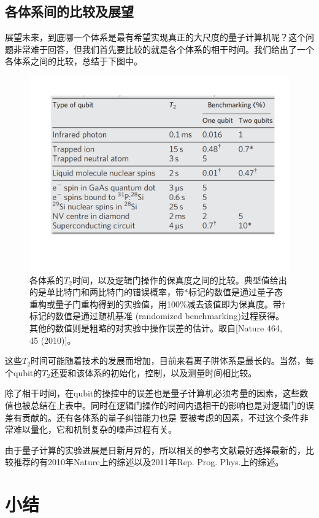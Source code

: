 \subsection{各体系间的比较及展望}
展望未来，到底哪一个体系是最有希望实现真正的大尺度的量子计算机呢？这个问题非常难于回答，但我们首先要比较的就是各个体系的相干时间。我们给出了一个各体系之间的比较，总结于下图中。
\begin{figure}[htbp]
            \begin{center}
              \includegraphics[width= 0.8\columnwidth]{figures/compare.pdf}
              \caption{各体系的$T_2$时间，以及逻辑门操作的保真度之间的比较。典型值给出的是单比特门和两比特门的错误概率，带$\ast$标记的数值是通过量子态重构或量子门重构得到的实验值，用100$\%$减去该值即为保真度。带$\dagger$标记的数值是通过随机基准
              (randomized benchmarking)过程获得。其他的数值则是粗略的对实验中操作误差的估计。取自[Nature 464, 45 (2010)\cite{review1}]。
              }
              \label{nmr}
            \end{center}
  \end{figure}
这些$T_2$时间可能随着技术的发展而增加，目前来看离子阱体系是最长的。当然，每个qubit的$T_2$还要和该体系的初始化，控制，以及测量时间相比较。

除了相干时间，在qubit的操控中的误差也是量子计算机必须考量的因素，这些数值也被总结在上表中。同时在逻辑门操作的时间内退相干的影响也是对逻辑门的误差有贡献的。还有各体系的量子纠错能力也是
要被考虑的因素，不过这个条件非常难以量化，它和机制复杂的噪声过程有关。

由于量子计算的实验进展是日新月异的，所以相关的参考文献最好选择最新的，比较推荐的有2010年Nature上的综述\cite{review1}以及2011年Rep. Prog. Phys.上的综述\cite{review2}。

\section{小结}

